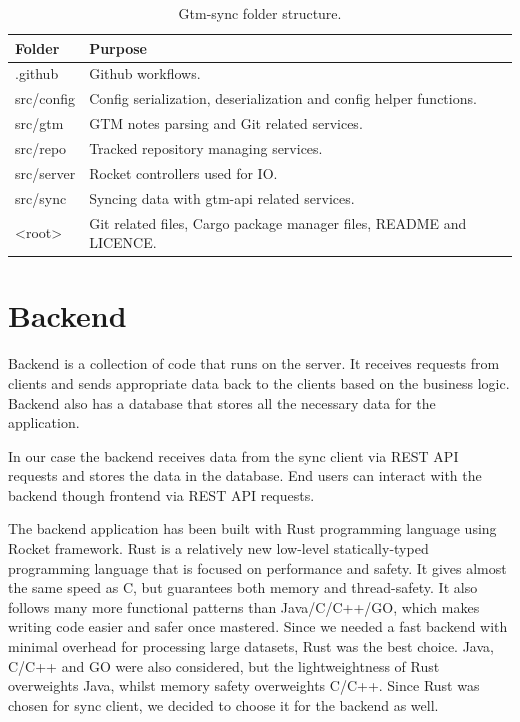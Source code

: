 \begin{table}[h]
    \centering
    \begin{tabular}{ | p{3cm} | p{10cm} |}
        \hline
        \textbf{Folder} & \textbf{Purpose}\\
        \hline
        .github & Github workflows.\\
        \hline
        src/config & Config serialization, deserialization and config helper functions.\\
        \hline
        src/gtm & GTM notes parsing and Git related services.\\
        \hline
        src/repo & Tracked repository managing services.\\
        \hline
        src/server & Rocket controllers used for IO.\\
        \hline
        src/sync & Syncing data with gtm-api related services.\\
        \hline
        <root> & Git related files, Cargo package manager files, README and LICENCE.\\
        \hline
    \end{tabular}
    \caption{Gtm-sync folder structure.}
    \label{tab:gtm-sync-folder-structure}
\end{table}

\section{Backend}\label{sec:backend}
Backend is a collection of code that runs on the server.
It receives requests from clients and sends appropriate data back to the clients based on the business logic.
Backend also has a database that stores all the necessary data for the application.

In our case the backend receives data from the sync client via REST API requests and stores the data in the database.
End users can interact with the backend though frontend via REST API requests.

The backend application has been built with Rust programming language using Rocket framework.
Rust is a relatively new low-level statically-typed programming language that is focused on performance and safety.
It gives almost the same speed as C, but guarantees both memory and thread-safety.
It also follows many more functional patterns than Java/C/C++/GO, which makes writing code easier and safer once mastered.
Since we needed a fast backend with minimal overhead for processing large datasets, Rust was the best choice.
Java, C/C++ and GO were also considered, but the lightweightness of Rust overweights Java, whilst memory safety overweights C/C++.
Since Rust was chosen for sync client, we decided to choose it for the backend as well.

